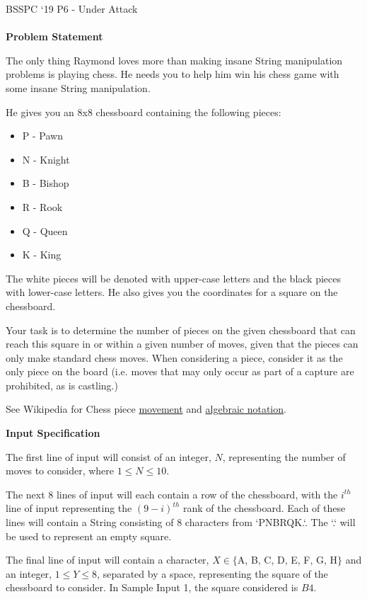 \documentclass[]{article}
\begin{document}
{\Large BSSPC ‘19 P6 - Under Attack}
\\\\
\textbf{\large Problem Statement}
\par
The only thing Raymond loves more than making insane String manipulation problems is playing chess. He needs you to help him win his chess game with some insane String manipulation.
\par
He gives you an 8x8 chessboard containing the following pieces:
\begin{itemize}
\item P - Pawn
\item N - Knight
\item B - Bishop
\item R - Rook
\item Q - Queen
\item K - King
\end{itemize}

\par
The white pieces will be denoted with upper-case letters and the black pieces with lower-case letters. He also gives you the coordinates for a square on the chessboard.

\par
Your task is to determine the number of pieces on the given chessboard that can reach this square in or within a given number of moves, given that the pieces can only make standard chess moves. When considering a piece, consider it as the only piece on the board (i.e. moves that may only occur as part of a capture are prohibited, as is castling.)

\par
See Wikipedia for Chess piece \href{https://en.wikipedia.org/wiki/Rules\_of\_chess\#Movement}{movement} and \href{https://en.wikipedia.org/wiki/Algebraic\_notation\_\%28chess\%29}{algebraic notation}.

\textbf{\large Input Specification}
\par
The first line of input will consist of an integer, $N$, representing the number of moves to consider, where $1 \le N \le 10$.

\par
The next 8 lines of input will each contain a row of the chessboard, with the $i^{th}$ line of input representing the $(9-i)^{th}$ rank of the chessboard. Each of these lines will contain a String consisting of 8 characters from `PNBRQK.`. The `.` will be used to represent an empty square.

\par
The final line of input will contain a character, $X \in \{$A, B, C, D, E, F, G, H$\}$ and an integer, $1 \le Y \le 8$, separated by a space, representing the square of the chessboard to consider. In Sample Input 1, the square considered is $B4$.
\end{document}
